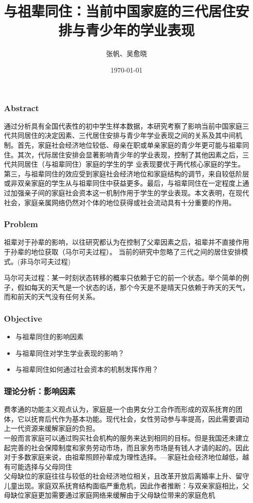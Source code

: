 \documentclass{beamer}
\title[文献分享:ZY]{与祖辈同住：当前中国家庭的三代居住安排与青少年的学业表现}
\author[张帆、吴愈晓]{张帆、吴愈晓}
\date{\today}
\begin{document}
\frame{\titlepage}



\begin{frame}
\frametitle{Abstract}
通过分析具有全国代表性的初中学生样本数据，本研究考察了影响当前中国家庭三代共同居住的决定因素、三代居住安排与青少年学业表现之间的关系及其中间机制。首先，家庭社会经济地位较低、母亲在职或单亲家庭的青少年更可能与祖辈同住。其次，代际居住安排会显著影响青少年的学业表现，控制了其他因素之后，三代共同居住（与祖辈同住）家庭的学生的学 业表现要优于两代核心家庭的学生。 第三，与祖辈同住的效应受到家庭社会经济地位和家庭结构的调节，来自较低阶层或非双亲家庭的学生从与祖辈同住中获益更多。最后，与祖辈同住在一定程度上通过加强亲子间的家庭社会资本这一机制作用于学生的学业表现。本文表明，在现代社会，家庭亲属网络仍然对个体的地位获得或社会流动具有十分重要的作用。
\end{frame}

\begin{frame}
\frametitle{Problem}
祖辈对于孙辈的影响，以往研究都认为在控制了父辈因素之后，祖辈并不直接作用于孙辈的地位获取（马尔可夫过程）。
当前的研究中忽略了三代之间的居住安排模式。(非马尔可夫过程)

马尔可夫过程：某一时刻状态转移的概率只依赖于它的前一个状态。举个简单的例子，假如每天的天气是一个状态的话，那个今天是不是晴天只依赖于昨天的天气，而和前天的天气没有任何关系。

\end{frame}


\begin{frame}
\frametitle{Objective}
\begin{itemize}
	\item 与祖辈同住的影响因素	
	\item 与祖辈同住对学生学业表现的影响？
	\item 与祖辈同住如何通过社会资本的机制发挥作用？
\end{itemize}
\end{frame}


\begin{frame}
	\frametitle{理论分析：影响因素}
	费孝通的功能主义观点认为，家庭是一个由男女分工合作而形成的双系抚育的团体，它以抚育后代作为基本功能。现代社会，女性劳动参与率提高，因此需要调动上一代资源来缓解家庭的负担。
	\\ 一般而言家庭可以通过购买社会机构的服务来达到相同的目标。但是我国还未建立起完善的社会保障制度和家务劳动市场，而且家务市场是有钱人才请的起的。因此对于多数家庭来说，由祖辈照顾孙辈成为理性选择。---家庭社会经济地位越低，越有可能选择与父母同住
	\\ 父母缺位的家庭往往与较低的社会经济地位相关，且改革开放后离婚率上升、留守儿童出现。家庭双系抚育结构面临严重危机，因此作者推断：与双亲家庭相比，父母缺位家庭更加需要通过家庭网络来缓解由于父母缺位带来的家庭危机
\end{frame}
\end{document}
